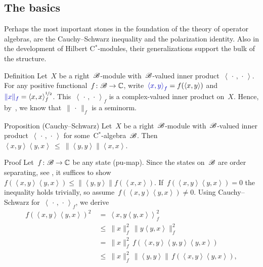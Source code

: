 \documentclass[b]{subfiles}
\begin{document}
\subsection{The basics}
\begin{parsec}%
\begin{point}%
    Perhaps the most important stones in the foundation
        of the theory of operator algebras,
        are the Cauchy--Schwarz inequality
        and the polarization identity.
    Also in the development of Hilbert C$^*$-modules,
        their generalizations support the bulk of the structure.
\end{point}
\begin{point}{Definition}%
Let~$X$ be a right~$\mathscr{B}$-module with~$\mathscr{B}$-valued inner
    product~$\left<\,\cdot\,,\,\cdot\,\right>$.
For any positive functional~$f\colon \mathscr{B} \to \mathbb{C}$,
    write~$\Define{\left<x,y\right>_f} = f(\left<x,y\right>)$
    and~$\Define{\|x\|_f} = \smash{ \langle x,x\rangle^{\nicefrac{1}{2}}_f}$.
This~$\left<\,\cdot\,,\,\cdot\,\right>_f$
    is a complex-valued inner product on~$X$.
Hence, by~,
    we know that~$\|\,\cdot\,\|_f$ is a seminorm.
\end{point}
\begin{point}[module-CS]{Proposition (Cauchy--Schwarz)}%
Let~$X$ be a right~$\mathscr{B}$-module
    with~$\mathscr{B}$-valued inner product~$\left<\,\cdot\,,\,\cdot\,\right>$
    for some~C$^*$-algebra~$\mathscr{B}$.
Then~$\left<x,y\right>\left<y,x\right> \ \leq\  \|\left<y,y\right>\| \left<x,x\right>$.
\begin{point}{Proof}%
Let~$f\colon \mathscr{B} \to \mathbb{C}$ be any state (pu-map).
Since the states on~$\mathscr{B}$ are order separating,
see ,
it suffices to show~$f(\left<x,y\right>\left<y,x\right>)
\leq \|\left<y,y\right>\| f(\left<x,x\right>)$.
If~$f(\left<x,y\right>\left<y,x\right>) = 0$
the inequality holds trivially,
so assume~$f(\left<x,y\right>\left<y,x\right>) \neq 0$.
Using Cauchy--Schwarz for~$\left<\,\cdot\,,\,\cdot\,\right>_f$,
    we derive
\begin{align*}
    f(\left<x,y\right>\left<y,x\right>)^2
        &\  =\  \left<x,y\left<y,x\right>\right>_f^2 \\
        &\  \leq\  \|x\|_f^2 \, \|y \left<y,x\right>\|_f^2 \\
    & \ =\  \|x\|_f^2\, f(\left<x,y\right>\left<y,y\right>\left<y,x\right>)\\
    & \ \leq\  \|x\|_f^2 \,
    \|\left<y,y\right>\| \,
    f(\left<x,y\right>\left<y,x\right>),

\end{align*}
\end{point}
\end{point}
\end{parsec}
\end{document}

